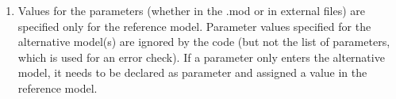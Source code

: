 \documentclass[12pt]{article}
\begin{document}
\begin{enumerate}
\item Values for the parameters (whether in the .mod or in external files) are specified only for the reference model. Parameter values
specified for the alternative model(s) are ignored by the code (but not the
list of parameters, which is used for an error check). If a parameter only enters the alternative model, it
needs to be declared as parameter and assigned a value in the reference
model.
\end{enumerate}
\end{document}
